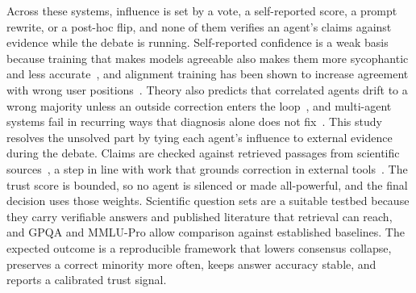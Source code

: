 Across these systems, influence is set by a vote, a self-reported score, a prompt rewrite, or a post-hoc flip, and none of them verifies an agent's claims against evidence while the debate is running. Self-reported confidence is a weak basis because training that makes models agreeable also makes them more sycophantic and less accurate~\cite{ibrahim2026training}, and alignment training has been shown to increase agreement with wrong user positions~\cite{chen2025self}. Theory also predicts that correlated agents drift to a wrong majority unless an outside correction enters the loop~\cite{estornell2024multillm}, and multi-agent systems fail in recurring ways that diagnosis alone does not fix~\cite{cemri2025why}. This study resolves the unsolved part by tying each agent's influence to external evidence during the debate. Claims are checked against retrieved passages from scientific sources~\cite{karpukhin2020dense,kushwaha2026agentbased}, a step in line with work that grounds correction in external tools~\cite{gou2024critic}. The trust score is bounded, so no agent is silenced or made all-powerful, and the final decision uses those weights. Scientific question sets are a suitable testbed because they carry verifiable answers and published literature that retrieval can reach, and GPQA and MMLU-Pro allow comparison against established baselines. The expected outcome is a reproducible framework that lowers consensus collapse, preserves a correct minority more often, keeps answer accuracy stable, and reports a calibrated trust signal.
